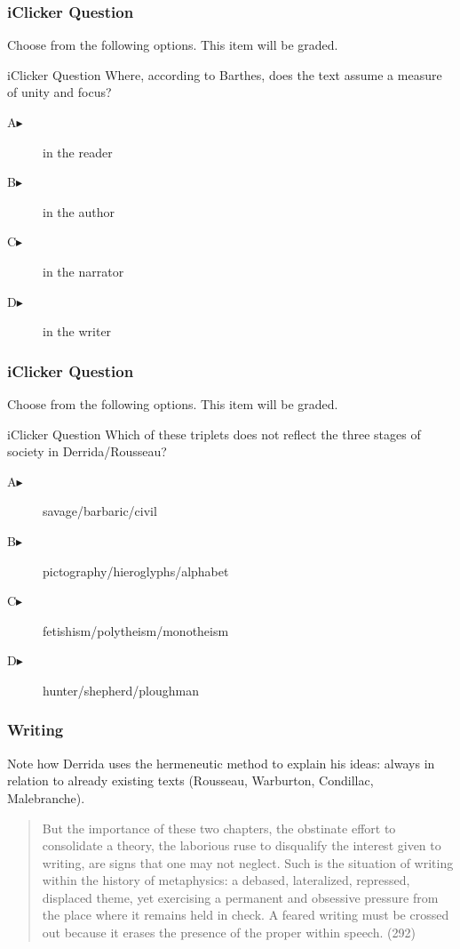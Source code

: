 \documentclass[xcolor=dvipsnames]{beamer}
\begin{document}
\begin{frame}
  \frametitle{iClicker Question}
Choose from the following options. This item will be graded.
\begin{block}{iClicker Question}
Where, according to Barthes, does the text assume a measure of unity
and focus?
\end{block}
\begin{description}
\item[A\hspace{.2in}$\blacktriangleright$] in the reader
\item[B\hspace{.2in}$\blacktriangleright$] in the author
\item[C\hspace{.2in}$\blacktriangleright$] in the narrator
\item[D\hspace{.2in}$\blacktriangleright$] in the writer
\end{description}
\end{frame}

\begin{frame}
  \frametitle{iClicker Question}
Choose from the following options. This item will be graded.
\begin{block}{iClicker Question}
Which of these triplets does not reflect the three stages of society in Derrida/Rousseau?
\end{block}
\begin{description}
\item[A\hspace{.2in}$\blacktriangleright$] savage/barbaric/civil
\item[B\hspace{.2in}$\blacktriangleright$] pictography/hieroglyphs/alphabet
\item[C\hspace{.2in}$\blacktriangleright$] fetishism/polytheism/monotheism
\item[D\hspace{.2in}$\blacktriangleright$] hunter/shepherd/ploughman
\end{description}
\end{frame}

\begin{frame}
  \frametitle{Writing}
  Note how Derrida uses the hermeneutic method to explain his ideas:
  always in relation to already existing texts (Rousseau, Warburton,
  Condillac, Malebranche).
  \begin{quote}
    But the importance of these two chapters, the obstinate effort to
    consolidate a theory, the laborious ruse to disqualify the
    interest given to writing, are signs that one may not
    neglect. Such is the situation of writing within the history of
    metaphysics: a debased, lateralized, repressed, displaced theme, yet
    exercising a permanent and obsessive pressure from the place where
    it remains held in check. A feared writing must be crossed out
    because it erases the presence of the proper within speech. (292)
  \end{quote}
\end{frame}
\end{document}
